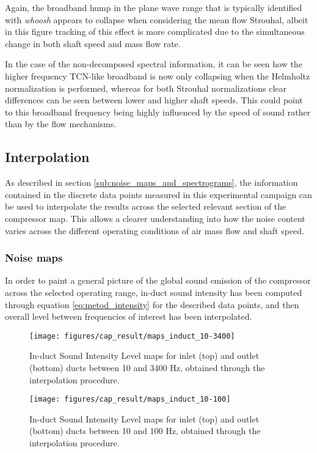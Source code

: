 Again, the broadband hump in the plane wave range that is typically identified with \emph{whoosh} appears to collapse when considering the mean flow Strouhal, albeit in this figure tracking of this effect is more complicated due to the simultaneous change in both shaft speed and mass flow rate. 

In the case of the non-decomposed spectral information, it can be seen how the higher frequency TCN-like broadband is now only collapsing when the Helmholtz normalization is performed, whereas for both Strouhal normalizations clear differences can be seen between lower and higher shaft speeds. This could point to this broadband frequency being highly influenced by the speed of sound rather than by the flow mechanisms.

\subsection{Interpolation}

As described in section \ref{sub:noise_maps_and_spectrograms}, the information contained in the discrete data points measured in this experimental campaign can be used to interpolate the results across the selected relevant section of the compressor map. This allows a clearer understanding into how the noise content varies across the different operating conditions of air mass flow and shaft speed.

\subsubsection{Noise maps}

In order to paint a general picture of the global sound emission of the compressor across the selected operating range, in-duct sound intensity has been computed through equation \ref{eq:metod_intensity} for the described data points, and then overall level between frequencies of interest has been interpolated. 

\begin{figure}[tbh!]
\centering
\texttt{[image: figures/cap\_result/maps\_induct\_10-3400]}
\vspace{-2.25cm}
\caption[In-duct SIL maps between 10 and 3400 Hz]{In-duct Sound Intensity Level maps for inlet (top) and outlet (bottom) ducts between 10 and 3400 Hz, obtained through the interpolation procedure.}
\label{fig:maps_induct_10-3400}
\end{figure}

\begin{figure}[tbh!]
\centering
\texttt{[image: figures/cap\_result/maps\_induct\_10-100]}
\vspace{-2.25cm}
\caption[In-duct SIL maps between 10 and 100 Hz]{In-duct Sound Intensity Level maps for inlet (top) and outlet (bottom) ducts between 10 and 100 Hz, obtained through the interpolation procedure.}
\label{fig:maps_induct_10-100}
\end{figure}


